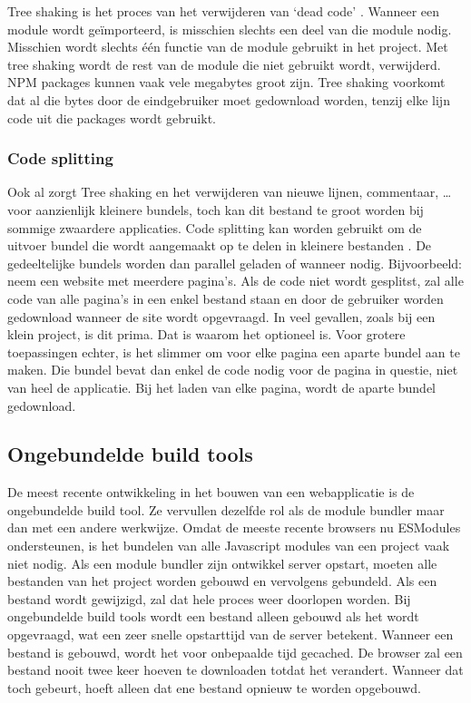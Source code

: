 Tree shaking is het proces van het verwijderen van ‘dead code’ \autocite{webpack-no-dateC}. Wanneer een module wordt geïmporteerd, is misschien slechts een deel van die module nodig. Misschien wordt slechts één functie van de module gebruikt in het project. Met tree shaking wordt de rest van de module die niet gebruikt wordt, verwijderd. NPM \gls{packages} kunnen vaak vele megabytes groot zijn. Tree shaking voorkomt dat al die bytes door de eindgebruiker moet gedownload worden, tenzij elke lijn code uit die \gls{packages} wordt gebruikt. 

\subsubsection{Code splitting}

Ook al zorgt Tree shaking en het verwijderen van nieuwe lijnen, commentaar, … voor aanzienlijk kleinere bundels, toch kan dit bestand te groot worden bij sommige zwaardere applicaties. Code splitting kan worden gebruikt om de uitvoer bundel die wordt aangemaakt op te delen in kleinere bestanden \autocite{mozilla-2021D}. De gedeeltelijke bundels worden dan parallel geladen of wanneer nodig. Bijvoorbeeld: neem een website met meerdere pagina's. Als de code niet wordt gesplitst, zal alle code van alle pagina's in een enkel bestand staan en door de gebruiker worden gedownload wanneer de site wordt opgevraagd. In veel gevallen, zoals bij een klein project, is dit prima. Dat is waarom het optioneel is. Voor grotere toepassingen echter, is het slimmer om voor elke pagina een aparte bundel aan te maken. Die bundel bevat dan enkel de code nodig voor de pagina in questie, niet van heel de applicatie. Bij het laden van elke pagina, wordt de aparte bundel gedownload.

\subsection{Ongebundelde build tools}
De meest recente ontwikkeling in het bouwen van een webapplicatie is de ongebundelde build tool. Ze vervullen dezelfde rol als de module bundler maar dan met een andere werkwijze. Omdat de meeste recente browsers nu ESModules ondersteunen, is het bundelen van alle \gls{Javascript} modules van een project vaak niet nodig. Als een module bundler zijn ontwikkel server opstart, moeten alle bestanden van het project worden gebouwd en vervolgens gebundeld. Als een bestand wordt gewijzigd, zal dat hele proces weer doorlopen worden. Bij ongebundelde build tools wordt een bestand alleen gebouwd als het wordt opgevraagd, wat een zeer snelle opstarttijd van de server betekent. Wanneer een bestand is gebouwd, wordt het voor onbepaalde tijd gecached. De browser zal een bestand nooit twee keer hoeven te downloaden totdat het verandert. Wanneer dat toch gebeurt, hoeft alleen dat ene bestand opnieuw te worden opgebouwd. 

